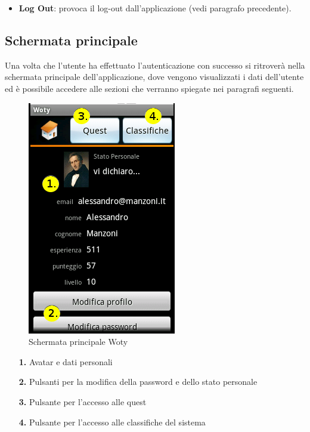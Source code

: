 \begin{itemize}
	\item \textbf{Log Out}: provoca il log-out dall'applicazione (vedi paragrafo precedente).	
\end{itemize}

\subsection{Schermata principale}

Una volta che l'utente ha effettuato l'autenticazione con successo si ritroverà nella schermata principale dell'applicazione, dove vengono visualizzati i dati dell'utente ed è possibile accedere alle sezioni che verranno spiegate nei paragrafi seguenti.

\begin{center}
\begin{figure}[H]
\centering
\includegraphics[scale=0.70]{images/home.png}
\caption{ Schermata principale Woty }
\end{figure}
\end{center}	

\begin{itemize}
	\item[\textbf{1.}] Avatar e dati personali
	\item[\textbf{2.}] Pulsanti per la modifica della password e dello stato personale
	\item[\textbf{3.}] Pulsante per l'accesso alle quest
	\item[\textbf{4.}] Pulsante per l'accesso alle classifiche del sistema
\end{itemize}



